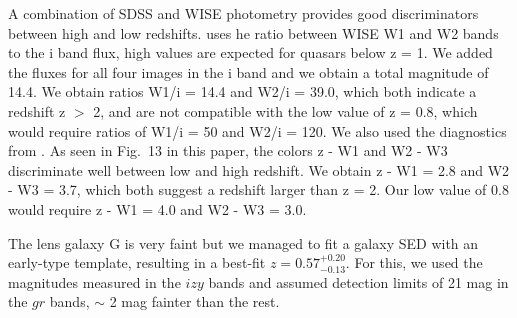 \documentclass[manuscript]{aastex}
\begin{document}
\begin{itemize}
{\bf \item A combination of SDSS and WISE photometry provides good discriminators between high and low redshifts. \citet{pom15} uses he ratio between WISE W1 and W2 bands to the i band flux, high values are expected for quasars below z = 1. We added the fluxes for all four images in the i band and we obtain a total magnitude of 14.4. We obtain ratios W1/i = 14.4 and W2/i = 39.0, which both indicate a redshift z $>$ 2, and are not compatible with the low value of z = 0.8, which would require ratios of W1/i = 50 and W2/i = 120. We also used the diagnostics from \citet{wu12}. As seen in Fig.~13 in this paper, the colors z - W1 and W2 - W3 discriminate well between low and high redshift. We obtain z - W1 = 2.8 and W2 - W3 = 3.7, which both suggest a redshift larger than z = 2. Our low value of 0.8 would require z - W1 = 4.0 and W2 - W3 = 3.0.
}
\end{itemize}

The lens galaxy G is very faint but we managed to fit a galaxy SED with an early-type template, resulting in a best-fit $z = 0.57^{+0.20}_{-0.13}$. For this, we used the magnitudes measured in the $izy$ bands and assumed detection limits of 21 mag in the $gr$ bands, $\sim$ 2 mag fainter than the rest. 
\end{document}
